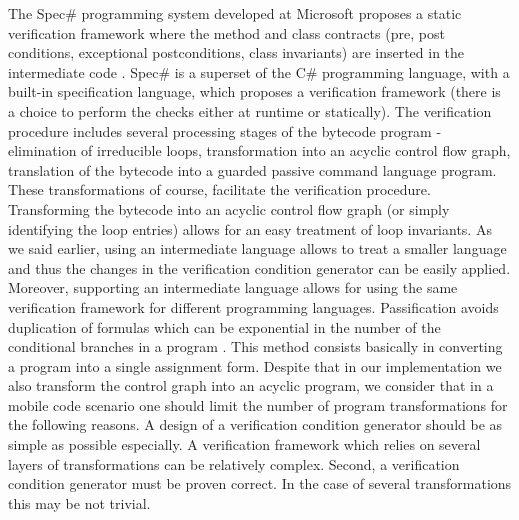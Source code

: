 The Spec\# \cite{BLS04sp} programming system developed at Microsoft proposes a static verification framework where 
 the method and class contracts  (pre, post conditions, exceptional postconditions, class invariants) are inserted in the intermediate code . 
 Spec\# is a superset of the C\# programming language, with a built-in  specification language, 
 which proposes a verification framework (there is a choice to perform the checks either at runtime or statically). 
 The verification procedure \cite{leinoWPUP} includes several processing stages of the bytecode program -  
 elimination of irreducible loops, transformation into an acyclic control flow graph,
 translation of the bytecode into a guarded passive command language program. 
 These transformations of course, facilitate the verification procedure.
 Transforming the bytecode into an acyclic control flow graph (or simply identifying the loop entries)
 allows for an easy treatment of loop invariants. As we said earlier, using an intermediate language allows to treat a smaller
 language and thus the changes in the verification condition generator can be easily applied. 
 Moreover, supporting an intermediate language allows for using the same verification framework for different programming languages. 
 Passification avoids duplication of formulas which can be exponential in the number of the conditional branches in a program 
\cite{RL05EWP}. This method consists basically in converting a program into a single assignment form.
 Despite that  in our implementation we also
  transform  the control graph into an acyclic program, we consider that in a mobile code scenario
 one should limit the number of program transformations for the following reasons.
 A design of a verification condition generator should be as simple as possible especially.
 A verification framework which relies on several layers of transformations
 can be relatively complex.  Second,  a verification condition generator must be proven correct. In the case of several transformations this may be not trivial.




 


 
